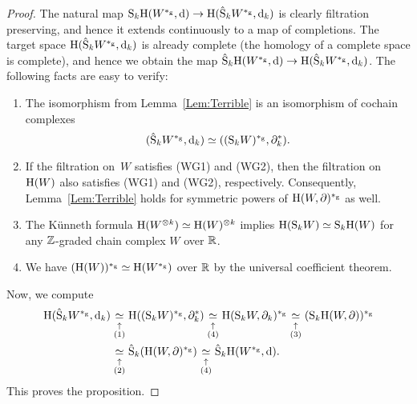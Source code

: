 \documentclass[\MainFolder/Text.tex]{subfiles}
\begin{document}
\begin{proof}
The natural map $\mathrm{S}_k \mathrm{H}(W^{*_{\mathrm{g}}},\mathrm{d}) \rightarrow \mathrm{H}(\hat{\mathrm{S}}_k W^{*_{\mathrm{g}}},\mathrm{d}_k)$ is clearly filtration preserving, and hence it extends continuously to a map of completions. The target space $\mathrm{H}(\hat{\mathrm{S}}_k W^{*_{\mathrm{g}}},\mathrm{d}_k)$ is already complete (the homology of a complete space is complete), and hence we obtain the map $\hat{\mathrm{S}}_k \mathrm{H}(W^{*_{\mathrm{g}}},\mathrm{d}) \rightarrow \mathrm{H}(\hat{\mathrm{S}}_k W^{*_{\mathrm{g}}},\mathrm{d}_k)$. The following facts are easy to verify:
\begin{enumerate}[label=(\arabic*)]
 \item The isomorphism from Lemma~\ref{Lem:Terrible} is an isomorphism of cochain complexes 
 $$ (\hat{\mathrm{S}}_k W^{*_{\mathrm{g}}}, \mathrm{d}_k) \simeq ((\mathrm{S}_k W)^{*_{\mathrm{g}}}, \partial_k^*). $$
\item If the filtration on~$W$ satisfies (WG1) and (WG2), then the filtration on $\mathrm{H}(W)$ also satisfies (WG1) and (WG2), respectively. Consequently, Lemma~\ref{Lem:Terrible} holds for symmetric powers of $\mathrm{H}(W,\partial)^{*_{\mathrm{g}}}$ as well.
\item The Künneth formula $\mathrm{H}(W^{\otimes k}) \simeq \mathrm{H}(W)^{\otimes k}$ implies $\mathrm{H}(\mathrm{S}_k W) \simeq \mathrm{S}_k \mathrm{H}(W)$ for any $\mathbb{Z}$-graded chain complex $W$ over $\mathbb{R}$.
\item We have $(\mathrm{H}(W))^{*_{\mathrm{g}}} \simeq \mathrm{H}(W^{*_{\mathrm{g}}})$ over $\mathbb{R}$ by the universal coefficient theorem.
\end{enumerate}
Now, we compute
\begin{align*}
\H(\hat{\Sym}_k W^{\GD},\Dd_k ) &
\underset{\substack{\uparrow\rule{0pt}{1.5ex} \\ (1)}}{\simeq}
\H((\Sym_k W)^{\GD}, \Bdd_k^*)
\underset{\substack{\uparrow\rule{0pt}{1.5ex} \\ (4)}}{\simeq}
\H(\Sym_k W, \Bdd_k)^{\GD} 
\underset{\substack{\uparrow\rule{0pt}{1.5ex} \\ (3)}}{\simeq}
(\Sym_k \H(W,\Bdd))^{\GD} \\ 
&\underset{\substack{\uparrow\rule{0pt}{1.5ex} \\ (2)}}{\simeq}
\hat{\Sym}_k (\H(W,\Bdd)^{\GD}) 
\underset{\substack{\uparrow\rule{0pt}{1.5ex} \\ (4)}}{\simeq}
\hat{\Sym}_k \H(W^{\GD},\Dd).
\end{align*}
This proves the proposition.
\end{proof}
\end{document}
